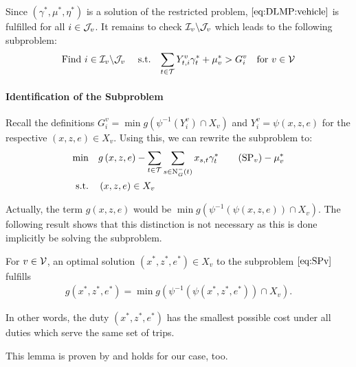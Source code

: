 Since $\left(\gamma^*,\mu^*,\eta^*\right)$ is a solution of the restricted problem, $\eqref{eq:DLMP:vehicle}$ is fulfilled for all $i\in\mathcal{J}_v$. It remains to check $\mathcal{I}_v\backslash\mathcal{J}_v$ which leads to the following subproblem:
\begin{align}
	\text{Find } i\in\mathcal{I}_v\backslash\mathcal{J}_v && \text{ s.t.} && \sum_{t\in\mathcal{T}}Y^v_{t,i}\gamma^*_t + \mu^*_v > G^v_i && \text{for } v\in\mathcal{V} \label{eq:DLMP:index}
\end{align}

\newpage

\paragraph{Identification of the Subproblem} \parfill

Recall the definitions ${G^v_i = \min g\left(\psi^{-1}\left(Y^v_i\right)\cap X_v\right)}$ and ${Y^v_i = \psi(x,z,e)}$ for the respective ${(x,z,e)\in X_v}$. Using this, we can rewrite the subproblem to: 
\begin{align*}
	\min \quad & g\left(x,z,e\right)-\sum_{t\in\mathcal{T}}\sum_{s\in\Nin(t)}x_{s,t}\gamma^*_t \tag{$\operatorname{SP}_v$} - \mu^*_v \label{eq:SPv} \\
	\text{s.t.} \quad & \left(x,z,e\right)\in X_v
\end{align*}

Actually, the term $g(x,z,e)$ would be ${\min g\left(\psi^{-1}\left(\psi(x,z,e)\right)\cap X_v\right)}$. The following result shows that this distinction is not necessary as this is done implicitly be solving the subproblem.

\begin{lemma}

For $v\in\mathcal{V}$, an optimal solution ${\left(x^*,z^*,e^*\right)\in X_v}$ to the subproblem $\eqref{eq:SPv}$ fulfills
\begin{align*}
	g\left(x^*,z^*,e^*\right) = \min g\left(\psi^{-1}\left(\psi\left(x^*,z^*,e^*\right)\right)\cap X_v\right).
\end{align*}

In other words, the duty $\left(x^*,z^*,e^*\right)$ has the smallest possible cost under all duties which serve the same set of trips.

\end{lemma}

This lemma is proven by \cite[pp.~42-43]{Kaiser} and holds for our case, too.


